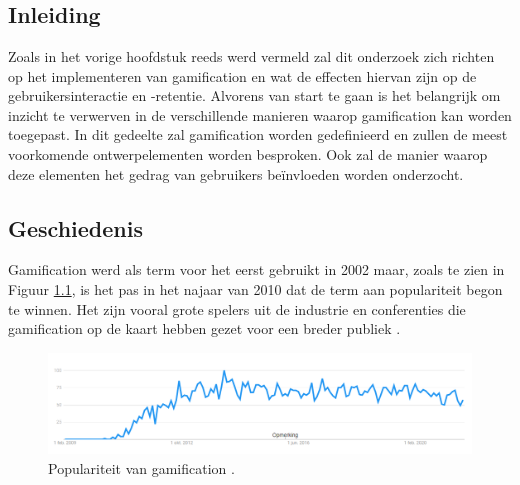 \chapter{}
\label{ch:stand-van-zaken}



\section{Inleiding}

Zoals in het vorige hoofdstuk reeds werd vermeld zal dit onderzoek zich richten op het implementeren van gamification en wat de effecten hiervan zijn op de gebruikersinteractie en -retentie. Alvorens van start te gaan is het belangrijk om inzicht te verwerven in de verschillende manieren waarop gamification kan worden toegepast. In dit gedeelte zal gamification worden gedefinieerd en zullen de meest voorkomende ontwerpelementen worden besproken. Ook zal de manier waarop deze elementen het gedrag van gebruikers beïnvloeden worden onderzocht.

\section{Geschiedenis}

Gamification werd als term voor het eerst gebruikt in 2002 \autocite{Pelling2011} maar, zoals te zien in Figuur \ref{fig:googletrends}, is het pas in het najaar van 2010 dat de term aan populariteit begon te winnen. Het zijn vooral grote spelers uit de industrie en conferenties die gamification op de kaart hebben gezet voor een breder publiek \autocite{Deterding20112}.

\begin{figure}
    \includegraphics[width=\linewidth]{GoogleTrends.png}
    \caption{Populariteit van gamification \autocite{GoogleTrends2021}.}
    \label{fig:googletrends}
\end{figure}

